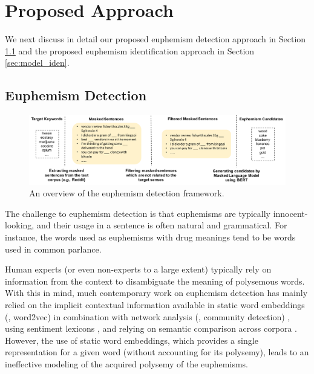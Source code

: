 
\section{Proposed Approach}
\label{sec:model}
We next discuss in detail our proposed euphemism detection approach in Section \ref{sec:model_det} and the proposed euphemism identification approach in Section \ref{sec:model_iden}. 


\subsection{Euphemism Detection}
\label{sec:model_det}
\begin{figure}
	\centering
	\includegraphics[width=1.0\linewidth]{figures/2}
	\caption{An overview of the euphemism detection framework.}
	\label{fig:model_det}
\end{figure}

The challenge to euphemism detection is that euphemisms are typically innocent-looking, and their usage in a sentence is often natural and grammatical. %
For instance, the words used as euphemisms with drug meanings tend to be words used in common parlance. 

Human experts (or even non-experts to a large extent) typically rely on information from the context to disambiguate the meaning of polysemous words. With this in mind,
much contemporary work on  euphemism detection has mainly relied on the implicit contextual information available in static word embeddings (\eg, word2vec) in combination with network analysis (\eg, community detection) \cite{taylor2017surfacing,magu2018determining}, using sentiment lexicons \cite{felt2020recognizing}, and relying on semantic comparison across corpora \cite{yuan2018reading}. 
However, the use of static word embeddings, which provides a single representation for a given word (without accounting for its polysemy), leads to an ineffective modeling of the acquired polysemy of the euphemisms. 


